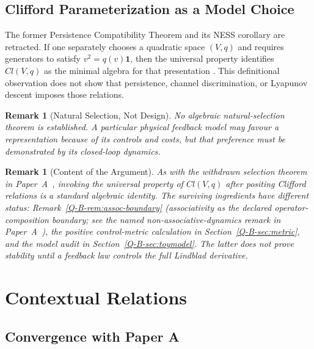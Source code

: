 \documentclass[12pt,a4paper,openany]{book}
\newtheorem{remark}[theorem]{Remark}
\begin{document}
\subsection{Clifford Parameterization as a Model Choice}

The former Persistence Compatibility Theorem and its NESS corollary are retracted.  If one separately chooses a quadratic space $(V,q)$ and requires generators to satisfy $v^2=q(v)\mathbf1$, then the universal property identifies $Cl(V,q)$ as the minimal algebra for that presentation \cite{Hestenes1966}.  This definitional observation does not show that persistence, channel discrimination, or Lyapunov descent imposes those relations.

\begin{remark}[Natural Selection, Not Design]
No algebraic natural-selection theorem is established.  A particular physical feedback model may favour a representation because of its controls and costs, but that preference must be demonstrated by its closed-loop dynamics.
\end{remark}

\begin{remark}[Content of the Argument]
\label{Q-B-rem:scope}
As with the withdrawn selection theorem in Paper~A~\cite{Liu2026QRAIF_A}, invoking the universal property of $Cl(V,q)$ after positing Clifford relations is a standard algebraic identity.
The surviving ingredients have different status:
Remark~\ref{Q-B-rem:assoc-boundary} (associativity as the declared operator-composition boundary; see the named non-associative-dynamics remark in Paper~A~\cite{Liu2026QRAIF_A}),
the positive control-metric calculation in Section~\ref{Q-B-sec:metric}, and the model audit in Section~\ref{Q-B-sec:toymodel}.  The latter does not prove stability until a feedback law controls the full Lindblad derivative.
\end{remark}

\section{Contextual Relations}
\label{Q-B-sec:context}

\subsection{Convergence with Paper A}
\end{document}
